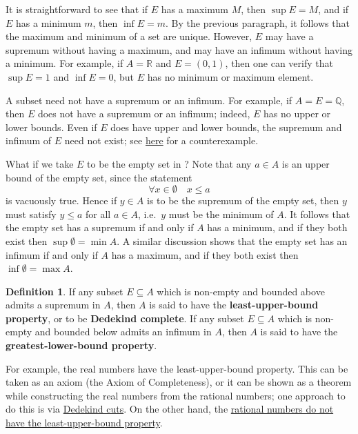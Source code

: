 \documentclass[12pt]{article}
\theoremstyle{definition}
\newtheorem{definition}{Definition}[section]
\begin{document}
It is straightforward to see that if \( E \) has a maximum \( M \), then \( \sup E = M \), and if \( E \) has a minimum \( m \), then \( \inf E = m \). By the previous paragraph, it follows that the maximum and minimum of a set are unique. However, \( E \) may have a supremum without having a maximum, and may have an infimum without having a minimum. For example, if \( A = \mathbb{R} \) and \( E = (0, 1) \), then one can verify that \( \sup E = 1 \) and \( \inf E = 0 \), but \( E \) has no minimum or maximum element.

A subset need not have a supremum or an infimum. For example, if \( A = E = \mathbb{Q} \), then \( E \) does not have a supremum or an infimum; indeed, \( E \) has no upper or lower bounds. Even if \( E \) does have upper and lower bounds, the supremum and infimum of \( E \) need not exist; see \href{https://lew98.github.io/Mathematics/PMA/Chapter_1/Q_does_not_have_the_least_upper_bound_property.pdf}{here} for a counterexample.

What if we take \( E \) to be the empty set in ? Note that any \( a \in A \) is an upper bound of the empty set, since the statement
\[
    \forall x \in \emptyset \quad x \leq a
\]
is vacuously true. Hence if \( y \in A \) is to be the supremum of the empty set, then \( y \) must satisfy \( y \leq a \) for all \( a \in A \), i.e.\ \( y \) must be the minimum of \( A \). It follows that the empty set has a supremum if and only if \( A \) has a minimum, and if they both exist then \( \sup \emptyset = \min A \). A similar discussion shows that the empty set has an infimum if and only if \( A \) has a maximum, and if they both exist then \( \inf \emptyset = \max A \).

\begin{definition}
\label{def:lub_glb_properties}
    If any subset \( E \subseteq A \) which is non-empty and bounded above admits a supremum in \( A \), then \( A \) is said to have the \textbf{least-upper-bound property}, or to be \textbf{Dedekind complete}. If any subset \( E \subseteq A \) which is non-empty and bounded below admits an infimum in \( A \), then \( A \) is said to have the \textbf{greatest-lower-bound property}.
\end{definition}

For example, the real numbers have the least-upper-bound property. This can be taken as an axiom (the Axiom of Completeness), or it can be shown as a theorem while constructing the real numbers from the rational numbers; one approach to do this is via \href{https://lew98.github.io/Mathematics/PMA/Chapter_1/Construction_of_R_from_Q_via_Dedekind_cuts.pdf}{Dedekind cuts}. On the other hand, the \href{https://lew98.github.io/Mathematics/PMA/Chapter_1/Q_does_not_have_the_least_upper_bound_property.pdf}{rational numbers do not have the least-upper-bound property}.
\end{document}
